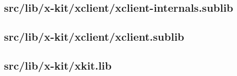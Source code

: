 \subsection{src/lib/x-kit/xclient/xclient-internals.sublib}


\subsection{src/lib/x-kit/xclient/xclient.sublib}


\subsection{src/lib/x-kit/xkit.lib}



